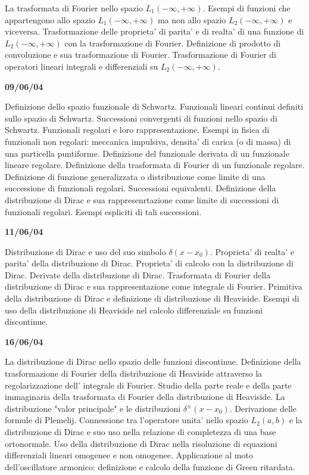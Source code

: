 \documentclass[a4paper,10pt]{article}
\begin{document}
\noindent 
La trasformata di Fourier nello spazio $L_1(-\infty,+\infty)$. Esempi di funzioni che appartengono allo spazio $L_1(-\infty,+\infty)$ ma non allo spazio $L_2(-\infty,+\infty)$ e viceversa. Trasformazione delle proprieta' di parita' e di realta' di una funzione di $L_2(-\infty,+\infty)$ con la trasformazione di Fourier. Definizione di prodotto di convoluzione e sua trasformazione di Fourier. Trasformazione di Fourier di operatori lineari integrali e differenziali su $L_2(-\infty,+\infty)$.


\vskip 12pt
\noindent
\textbf{09/06/04}

\noindent 
Definizione dello  spazio funzionale di Schwartz. Funzionali lineari continui definiti sullo spazio di Schwartz. Successioni convergenti di funzioni nello spazio di Schwartz. Funzionali regolari e loro rappresentazione. Esempi in fisica di funzionali non regolari: meccanica impulsiva, densita' di carica (o di massa) di una particella puntiforme. Definizione del funzionale derivata di un funzionale lineare regolare. Definizione della trasformata di Fourier di un funzionale regolare. Definizione di funzione generalizzata o distribuzione come limite di una successione di funzionali regolari. Successioni equivalenti. Definizione della distribuzione di Dirac e sua rappresenrtazione come limite di successioni di funzionali regolari. Esempi espliciti di tali successioni.  


\vskip 12pt
\noindent
\textbf{11/06/04}

\noindent
Distribuzione di Dirac e uso del suo simbolo $\delta (x-x_0)$. Proprieta' di realta' e parita' della distribuzione di Dirac. Proprieta' di calcolo con la distribuzione di Dirac. Derivate della distribuzione di Dirac. Trasformata di Fourier della distribuzione di Dirac e sua rappresentazione come integrale di Fourier. Primitiva della distribuzione di Dirac e definizione di distribuzione di Heaviside. Esempi di uso della distribuzione di Heaviside nel calcolo differenziale su funzioni discontinue. 


\vskip 12pt
\noindent
\textbf{16/06/04}

\noindent 
La distribuzione di Dirac nello spazio delle funzioni discontinue. Definizione della trasformazione di Fourier della distribuzione di Heaviside attraverso la regolarizzazione dell' integrale di Fourier.  Studio della parte reale e della parte immaginaria della trasformata di Fourier della distribuzione di Heaviside. La distribuzione "valor principale" e le distribuzioni $\delta^{\pm}(x-x_0)$. Derivazione delle formule di Plemelij. Connessione tra l'operatore unita' nello spazio $L_2(a,b)$ e la distribuzione di Dirac e suo uso nella relazione di completezza di una base ortonormale.  Uso della distribuzione di Dirac nella risoluzione di equazioni differenziali lineari omogenee e non omogenee. Applicazione al moto dell'oscillatore armonico: definizione e calcolo della funzione di Green ritardata. 
\end{document}
